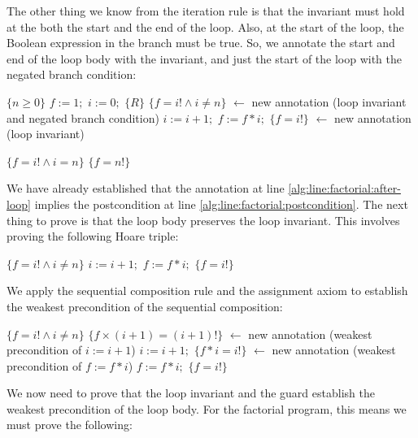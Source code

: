 \begin{example}
The other thing we know from the iteration rule is that the invariant must hold at the both the start and the end of the loop. Also, at the start of the loop, the Boolean expression in the branch must be true. So, we annotate the start and end of the loop body with the invariant, and just the start of the loop with the negated branch condition:

\begin{algorithmic}[1]
\State $\{n \geq 0\}$
\State $f := 1;$
\State $i := 0;$
\State $\{R\}$
   \State $\{f = i! \land i \neq n\}$ \hspace{11mm} $\leftarrow$ new annotation (loop invariant and negated branch condition)
  \State $i := i + 1;$
  \State $f := f * i;$
  \State $\{f = i!\}$   \hspace{24mm} $\leftarrow$ new annotation (loop invariant)
\EndWhile

\State $\{f = i! \land i = n\}$  \label{alg:line:factorial:after-loop}
\State $\{f = n!\}$  \label{alg:line:factorial:postcondition}
\end{algorithmic}

We have already established that the annotation at line \ref{alg:line:factorial:after-loop} implies the postcondition at line \ref{alg:line:factorial:postcondition}. The next thing to prove is that the loop body preserves the loop invariant. This involves proving the following Hoare triple:

\begin{algorithmic}[0]
  \State $\{f = i! \land i \neq n\}$
  \State $i := i + 1;$
  \State $f := f * i;$
  \State $\{f = i!\}$
\end{algorithmic}

We apply the sequential composition rule and the assignment axiom to establish the weakest precondition of the sequential composition:

\begin{algorithmic}[1]
  \State $\{f = i! \land i \neq n\}$
  \State $\{f \times (i + 1) = (i + 1)!\}$   \hspace{2mm} $\leftarrow$ new annotation (weakest precondition of $i := i + 1$)
  \State $i := i + 1;$
  \State $\{f * i = i!\}$   \hspace{22.5mm} $\leftarrow$ new annotation (weakest precondition of $f := f * i$)
  \State $f := f * i;$
  \State $\{f = i!\}$
\end{algorithmic}

We now need to prove that the loop invariant and the guard establish the weakest precondition of the loop body. For the factorial program, this means we must prove the following:


\end{example}
